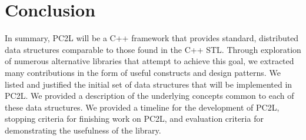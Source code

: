 \chapter{Conclusion} \label{conclusion}
In summary, PC2L will be a C++ framework that provides standard, distributed data structures comparable to those found in the C++ STL. Through exploration of numerous alternative libraries that attempt to achieve this goal, we extracted many contributions in the form of useful constructs and design patterns. We listed and justified the initial set of data structures that will be implemented in PC2L. We provided a description of the underlying concepts common to each of these data structures. We provided a timeline for the development of PC2L, stopping criteria for finishing work on PC2L, and evaluation criteria for demonstrating the usefulness of the library.  
